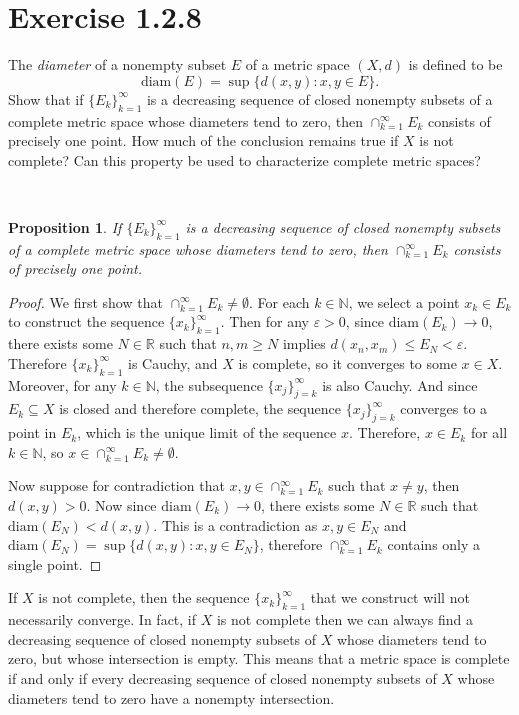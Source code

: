 \documentclass[12pt]{article}
\newcommand{\N}{\mathbb{N}}
\newcommand{\R}{\mathbb{R}}
\newcommand{\eps}{\varepsilon}
\newcommand{\diam}{\text{diam}}
\newenvironment{problem}
    {\begin{lrbox}{\mybox}\begin{minipage}{\textwidth-10pt}}
    {\end{minipage}\end{lrbox}\framebox[6.5in]{\usebox{\mybox}}\\}
\newtheorem{proposition}{Proposition}
\begin{document}
\section*{Exercise 1.2.8}
\begin{problem}
    The \textit{diameter} of a nonempty subset $E$ of a metric space $(X,d)$ is defined to be
    \[\diam(E) = \sup\{d(x,y):x,y\in E\}.\]
    Show that if $\{E_k\}_{k=1}^\infty$ is a decreasing sequence of closed nonempty subsets of a complete metric space whose diameters tend to zero, then $\cap_{k=1}^\infty E_k$ consists of precisely one point. How much of the conclusion remains true if $X$ is not complete? Can this property be used to characterize complete metric spaces?
\end{problem}

\begin{proposition}
    If $\{E_k\}_{k=1}^\infty$ is a decreasing sequence of closed nonempty subsets of a complete metric space whose diameters tend to zero, then $\cap_{k=1}^\infty E_k$ consists of precisely one point.
\end{proposition}

\begin{proof}
    We first show that $\cap_{k=1}^\infty E_k\ne \emptyset$. For each $k\in\N$, we select a point $x_k\in E_k$ to construct the sequence $\{x_k\}_{k=1}^\infty$. Then for any $\eps>0$, since $\diam(E_k)\to0$, there exists some $N\in\R$ such that $n,m\geq N$ implies $d(x_n,x_m)\leq E_N<\eps$. Therefore $\{x_k\}_{k=1}^\infty$ is Cauchy, and $X$ is complete, so it converges to some $x\in X$. Moreover, for any $k\in\N$, the subsequence $\{x_j\}_{j=k}^\infty$ is also Cauchy. And since $E_k\subseteq X$ is closed and therefore complete, the sequence $\{x_j\}_{j=k}^\infty$ converges to a point in $E_k$, which is the unique limit of the sequence $x$. Therefore, $x\in E_k$ for all $k\in\N$, so $x\in\cap_{k=1}^\infty E_k \ne \emptyset$.
    
    Now suppose for contradiction that $x,y\in\cap_{k=1}^\infty E_k$ such that $x\ne y$, then $d(x,y)>0$. Now since $\diam(E_k)\to0$, there exists some $N\in\R$ such that $\diam(E_N) < d(x,y)$. This is a contradiction as $x,y\in E_N$ and $\diam(E_N) = \sup\{d(x,y) : x,y\in E_N\}$, therefore $\cap_{k=1}^\infty E_k$ contains only a single point.
    
\end{proof}

If $X$ is not complete, then the sequence $\{x_k\}_{k=1}^\infty$ that we construct will not necessarily converge. In fact, if $X$ is not complete then we can always find a decreasing sequence of closed nonempty subsets of $X$ whose diameters tend to zero, but whose intersection is empty. This means that a metric space is complete if and only if every decreasing sequence of closed nonempty subsets of $X$ whose diameters tend to zero have a nonempty intersection. 
\end{document}
